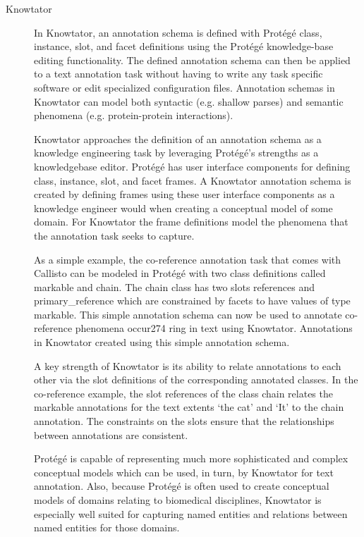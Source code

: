 \begin{description}
    \item[Knowtator]
    In Knowtator, an annotation
    schema is defined with Protégé class, instance,
    slot, and facet definitions using the Protégé knowledge-base editing functionality. The defined annotation schema can then be applied to a text
    annotation task without having to write any task
    specific software or edit specialized configuration
    files. Annotation schemas in Knowtator can model
    both syntactic (e.g. shallow parses) and semantic
    phenomena (e.g. protein-protein interactions).

    Knowtator approaches the definition of an annotation schema as a knowledge engineering task by
    leveraging Protégé’s strengths as a knowledgebase editor. Protégé has user interface components
    for defining class, instance, slot, and facet frames.
    A Knowtator annotation schema is created by defining frames using these user interface components as a knowledge engineer would when
    creating a conceptual model of some domain. For
    Knowtator the frame definitions model the phenomena that the annotation task seeks to capture.

    As a simple example, the co-reference annotation task that comes with Callisto can be modeled
    in Protégé with two class definitions called markable and chain. The chain class has two slots references and primary_reference which are
    constrained by facets to have values of type markable. This simple annotation schema can now be
    used to annotate co-reference phenomena occur274
    ring in text using Knowtator. Annotations in
    Knowtator created using this simple annotation
    schema.

    A key strength of Knowtator is its ability to relate annotations to each other via the slot definitions of the corresponding annotated classes. In
    the co-reference example, the slot references of the
    class chain relates the markable annotations for the
    text extents ‘the cat’ and ‘It’ to the chain annotation. The constraints on the slots ensure that the
    relationships between annotations are consistent.

    Protégé is capable of representing much more
    sophisticated and complex conceptual models
    which can be used, in turn, by Knowtator for text
    annotation. Also, because Protégé is often used to
    create conceptual models of domains relating to
    biomedical disciplines, Knowtator is especially
    well suited for capturing named entities and relations between named entities for those domains.


\end{description}
